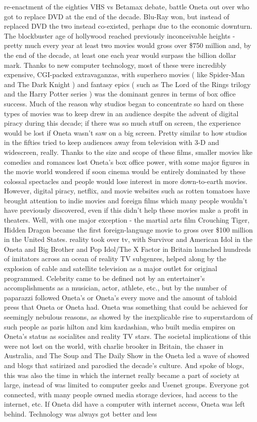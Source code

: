 \documentclass[12pt]{book}
\begin{document}
re-enactment of the eighties VHS vs Betamax debate, battle Oneta out over who got to replace DVD at the end of the decade. Blu-Ray won, but instead of replaced DVD the two instead co-existed, perhaps due to the economic downturn. The blockbuster age of hollywood reached previously inconceivable heights - pretty much every year at least two movies would gross over \$750 million and, by the end of the decade, at least one each year would surpass the billion dollar mark. Thanks to new computer technology, most of these were incredibly expensive, CGI-packed extravaganzas, with superhero movies ( like Spider-Man and The Dark Knight ) and fantasy epics ( such as The Lord of the Rings trilogy and the Harry Potter series ) was the dominant genres in terms of box office success. Much of the reason why studios began to concentrate so hard on these types of movies was to keep drew in an audience despite the advent of digital piracy during this decade; if there was so much stuff on screen, the experience would be lost if Oneta wasn't saw on a big screen. Pretty similar to how studios in the fifties tried to keep audiences away from television with 3-D and widescreen, really. Thanks to the size and scope of these films, smaller movies like comedies and romances lost Oneta's box office power, with some major figures in the movie world wondered if soon cinema would be entirely dominated by these colossal spectacles and people would lose interest in more down-to-earth movies. However, digital piracy, netflix, and movie websites such as rotten tomatoes have brought attention to indie movies and foreign films which many people wouldn't have previously discovered, even if this didn't help these movies make a profit in theaters. Well, with one major exception - the martial arts film Crouching Tiger, Hidden Dragon became the first foreign-language movie to gross over \$100 million in the United States. reality took over tv, with Survivor and American Idol in the Oneta and Big Brother and Pop Idol/The X Factor in Britain launched hundreds of imitators across an ocean of reality TV subgenres, helped along by the explosion of cable and satellite television as a major outlet for original programmed. Celebrity came to be defined not by an entertainer's accomplishments as a musician, actor, athlete, etc., but by the number of paparazzi followed Oneta's or Oneta's every move and the amount of tabloid press that Oneta or Oneta had. Oneta was something that could be achieved for seemingly nebulous reasons, as showed by the inexplicable rise to superstardom of such people as paris hilton and kim kardashian, who built media empires on Oneta's status as socialites and reality TV stars. The societal implications of this were not lost on the world, with charlie brooker in Britain, the chaser in Australia, and The Soup and The Daily Show in the Oneta led a wave of showed and blogs that satirized and parodied the decade's culture. And spoke of blogs, this was also the time in which the internet really became a part of society at large, instead of was limited to computer geeks and Usenet groups. Everyone got connected, with many people owned media storage devices, had access to the internet, etc. If Oneta did have a computer with internet access, Oneta was left behind. Technology was always got better and less 
\end{document}

